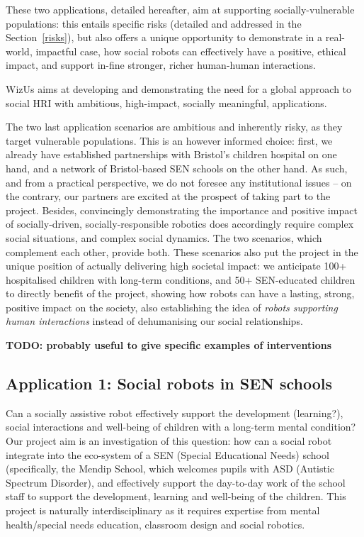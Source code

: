 \documentclass[11pt,a4paper]{report}
\newcommand{\project}{WizUs\xspace}
\newcommand{\TODO}[1]{{\color{red}\textbf{TODO: #1}}}
\begin{document}
These two applications, detailed hereafter, aim at supporting
socially-vulnerable populations: this entails specific risks (detailed and
addressed in the Section~\ref{risks}), but also offers a unique opportunity to
demonstrate in a real-world, impactful case, how social robots can effectively
have a positive, ethical impact, and support in-fine stronger, richer
human-human interactions.


\project aims at developing and demonstrating the need for a global approach to
social HRI with ambitious, high-impact, socially meaningful, applications.

The two last application scenarios are ambitious and inherently risky, as they
target vulnerable populations. This is an however informed choice: first, we
already have established partnerships with Bristol's children hospital on one
hand, and a network of Bristol-based SEN schools on the other hand. As such, and
from a practical perspective, we do not foresee any institutional issues -- on
the contrary, our partners are excited at the prospect of taking part to the
project. Besides, convincingly demonstrating the importance and positive impact
of socially-driven, socially-responsible robotics does accordingly require
complex social situations, and complex social dynamics. The two scenarios, which
complement each other, provide both. These scenarios also put the project in the
unique position of actually delivering high societal impact: we anticipate 100+
hospitalised children with long-term conditions, and 50+ SEN-educated children
to directly benefit of the project, showing how robots can have a lasting,
strong, positive impact on the society, also establishing the idea of
\emph{robots supporting human interactions} instead of dehumanising our social
relationships.


\TODO{probably useful to give specific examples of interventions}


\subsection{Application 1: Social robots in SEN schools}

Can a socially assistive robot effectively support the development (learning?),
social interactions and well-being of children with a long-term mental
condition? Our project aim is an investigation of this question: how can a
social robot integrate into the eco-system of a SEN (Special Educational Needs)
school (specifically, the Mendip School, which welcomes pupils with ASD
(Autistic Spectrum Disorder), and effectively support the day-to-day work of the
school staff to support the development, learning and well-being of the
children. This project is naturally interdisciplinary as it requires expertise
from mental health/special needs education, classroom design and social
robotics. 
\end{document}
